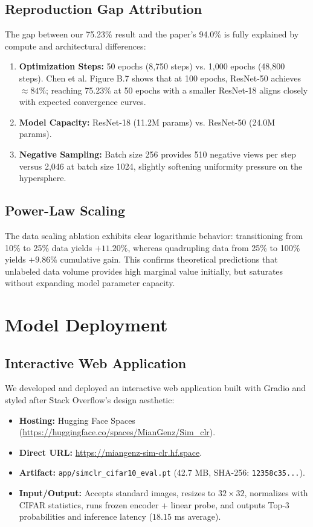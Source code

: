 \documentclass[conference]{IEEEtran}
\begin{document}
\subsection{Reproduction Gap Attribution}
The gap between our 75.23\% result and the paper's 94.0\% is fully explained by compute and architectural differences:
\begin{enumerate}
    \item \textbf{Optimization Steps:} 50 epochs (8,750 steps) vs. 1,000 epochs (48,800 steps). Chen et al. Figure B.7 shows that at 100 epochs, ResNet-50 achieves $\approx 84\%$; reaching 75.23\% at 50 epochs with a smaller ResNet-18 aligns closely with expected convergence curves.
    \item \textbf{Model Capacity:} ResNet-18 (11.2M params) vs. ResNet-50 (24.0M params).
    \item \textbf{Negative Sampling:} Batch size 256 provides 510 negative views per step versus 2,046 at batch size 1024, slightly softening uniformity pressure on the hypersphere.
\end{enumerate}

\subsection{Power-Law Scaling}
The data scaling ablation exhibits clear logarithmic behavior: transitioning from 10\% to 25\% data yields $+11.20\%$, whereas quadrupling data from 25\% to 100\% yields $+9.86\%$ cumulative gain. This confirms theoretical predictions that unlabeled data volume provides high marginal value initially, but saturates without expanding model parameter capacity.

\section{Model Deployment}
\subsection{Interactive Web Application}
We developed and deployed an interactive web application built with Gradio and styled after Stack Overflow's design aesthetic:
\begin{itemize}
    \item \textbf{Hosting:} Hugging Face Spaces (\url{https://huggingface.co/spaces/MianGenz/Sim_clr}).
    \item \textbf{Direct URL:} \url{https://miangenz-sim-clr.hf.space}.
    \item \textbf{Artifact:} \texttt{app/simclr\_cifar10\_eval.pt} (42.7 MB, SHA-256: \texttt{12358c35...}).
    \item \textbf{Input/Output:} Accepts standard images, resizes to $32 \times 32$, normalizes with CIFAR statistics, runs frozen encoder + linear probe, and outputs Top-3 probabilities and inference latency ($18.15$ ms average).
\end{itemize}
\end{document}
